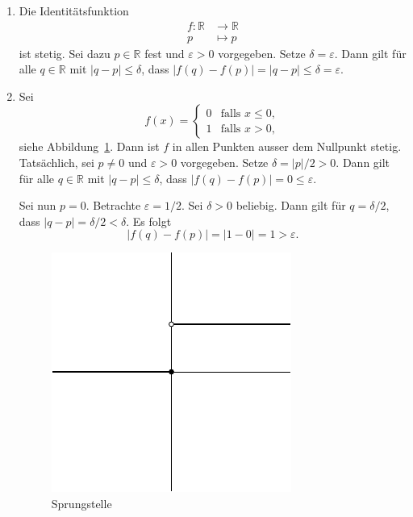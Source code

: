 \documentclass[../main.tex]{subfiles}
\begin{document}
\begin{examples}
  \leavevmode
  \begin{enumerate}[(1)]
    \item Die Identitätsfunktion
      \begin{align*}
        f \colon \mathbb{R} & \to \mathbb{R} \\
        p & \mapsto p
      \end{align*}
      ist stetig. Sei dazu $p \in \mathbb{R}$ fest
      und $\varepsilon > 0$ vorgegeben.
      Setze $\delta = \varepsilon$. Dann gilt
      für alle $q \in \mathbb{R}$ mit
      $|q - p| \leq \delta$, dass
      $|f(q) - f(p)| = |q - p| \leq \delta = \varepsilon$.
    \item Sei
      \[
        f(x) = 
        \begin{cases}
          0 & \text{falls } x \leq 0, \\
          1 & \text{falls } x > 0,
        \end{cases}
      \]
      siehe Abbildung~\ref{fig:jump}.
      Dann ist $f$ in allen Punkten ausser dem
      Nullpunkt stetig.
      Tatsächlich, sei $p \neq 0$
      und $\varepsilon > 0$ 
      vorgegeben.
      Setze $\delta = |p|/2 > 0$.
      Dann gilt für alle $q \in \mathbb{R}$ 
      mit $|q - p| \leq \delta$, dass
      $|f(q) - f(p)| = 0 \leq \varepsilon$.
      
      Sei nun $p = 0$. Betrachte $\varepsilon = 1/2$.
      Sei $\delta > 0$ beliebig.
      Dann gilt für $q = \delta/2$, dass
      $|q - p| = \delta/2 < \delta$.
      Es folgt
      \[
        |f(q) - f(p)| = |1 - 0| = 1 > \varepsilon.
      \]
      \begin{figure}[htb]
        \centering
      \includegraphics{chapter3/images/jump}
        \caption{Sprungstelle}%
        \label{fig:jump}
      \end{figure}


\end{enumerate}
\end{examples}
\end{document}
